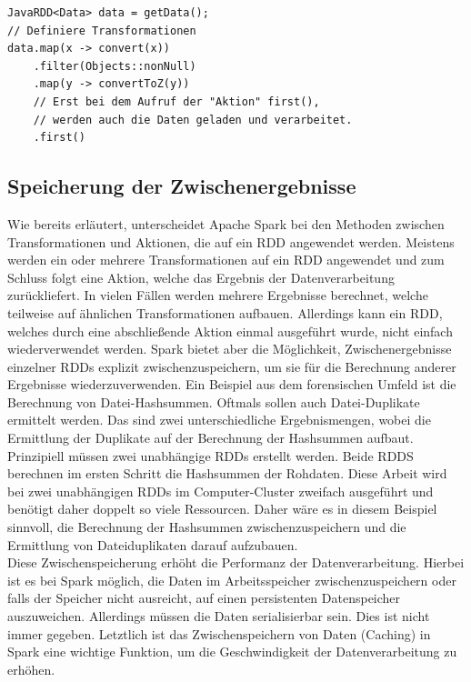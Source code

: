 \begin{lstlisting}[label={lst:spark_lazy_loading},caption= Lazy Loading bei Apache Spark ,captionpos=b,frame=single,style=customjava]
JavaRDD<Data> data = getData();
// Definiere Transformationen
data.map(x -> convert(x))
	.filter(Objects::nonNull)
	.map(y -> convertToZ(y))
	// Erst bei dem Aufruf der "Aktion" first(),
	// werden auch die Daten geladen und verarbeitet.
	.first()
\end{lstlisting}

\subsection*{Speicherung der Zwischenergebnisse}
Wie bereits erläutert, unterscheidet Apache Spark bei den Methoden zwischen Transformationen und Aktionen, die auf ein RDD angewendet werden. Meistens werden ein oder mehrere Transformationen auf ein RDD angewendet und zum Schluss folgt eine Aktion, welche das Ergebnis der Datenverarbeitung zurückliefert. In vielen Fällen werden mehrere Ergebnisse berechnet, welche teilweise auf ähnlichen Transformationen aufbauen. Allerdings kann ein RDD, welches durch eine abschließende Aktion einmal ausgeführt wurde, nicht einfach wiederverwendet werden. Spark bietet aber die Möglichkeit, Zwischenergebnisse einzelner RDDs explizit zwischenzuspeichern, um sie für die Berechnung anderer Ergebnisse wiederzuverwenden. Ein Beispiel aus dem forensischen Umfeld ist die Berechnung von Datei-Hashsummen. Oftmals sollen auch Datei-Duplikate ermittelt werden. Das sind zwei unterschiedliche Ergebnismengen, wobei die Ermittlung der Duplikate auf der Berechnung der Hashsummen aufbaut. Prinzipiell müssen zwei unabhängige RDDs erstellt werden. Beide RDDS berechnen im ersten Schritt die Hashsummen der Rohdaten. Diese Arbeit wird bei zwei unabhängigen RDDs im Computer-Cluster zweifach ausgeführt und benötigt daher doppelt so viele Ressourcen. Daher wäre es in diesem Beispiel sinnvoll, die Berechnung der Hashsummen zwischenzuspeichern und die Ermittlung von Dateiduplikaten darauf aufzubauen.\\
Diese Zwischenspeicherung erhöht die Performanz der Datenverarbeitung. Hierbei ist es bei Spark möglich, die Daten im Arbeitsspeicher zwischenzuspeichern oder falls der Speicher nicht ausreicht, auf einen persistenten Datenspeicher auszuweichen. Allerdings müssen die Daten serialisierbar sein. Dies ist nicht immer gegeben. Letztlich ist das Zwischenspeichern von Daten (Caching) in Spark eine wichtige Funktion, um die Geschwindigkeit der Datenverarbeitung zu erhöhen.\cite{spark_rdd}

